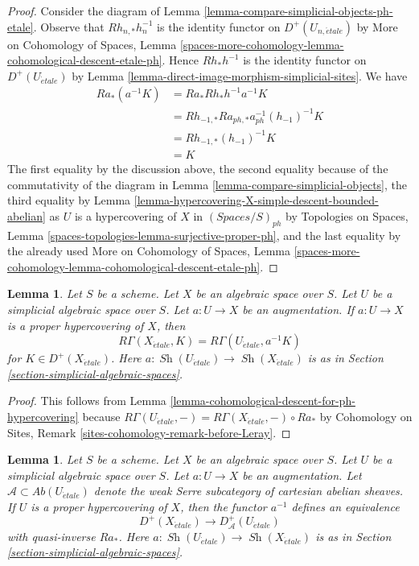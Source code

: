 \documentclass{stacks-project}
\theoremstyle{plain}
\newtheorem{lemma}[subsection]{Lemma}
\theoremstyle{definition}
\theoremstyle{remark}
\numberwithin{equation}{subsection}
\def\Sh{\mathop{\mathit{Sh}}\nolimits}
\def\etale{{\acute{e}tale}}
\begin{document}
\begin{proof}
Consider the diagram of Lemma \ref{lemma-compare-simplicial-objects-ph-etale}.
Observe that $Rh_{n, *}h_n^{-1}$ is the identity functor
on $D^+(U_{n, \etale})$ by
More on Cohomology of Spaces, Lemma
\ref{spaces-more-cohomology-lemma-cohomological-descent-etale-ph}.
Hence $Rh_*h^{-1}$ is the identity functor on
$D^+(U_\etale)$ by
Lemma \ref{lemma-direct-image-morphism-simplicial-sites}.
We have
\begin{align*}
Ra_*(a^{-1}K)
& =
Ra_*Rh_*h^{-1}a^{-1}K \\
& =
Rh_{-1, *}Ra_{ph, *}a_{ph}^{-1}(h_{-1})^{-1}K \\
& =
Rh_{-1, *}(h_{-1})^{-1}K \\
& =
K
\end{align*}
The first equality by the discussion above, the second equality
because of the commutativity of the diagram in
Lemma \ref{lemma-compare-simplicial-objects}, the third equality by
Lemma \ref{lemma-hypercovering-X-simple-descent-bounded-abelian}
as $U$ is a hypercovering of $X$ in $(\textit{Spaces}/S)_{ph}$
by Topologies on Spaces, Lemma
\ref{spaces-topologies-lemma-surjective-proper-ph},
and the last equality by the already used
More on Cohomology of Spaces, Lemma
\ref{spaces-more-cohomology-lemma-cohomological-descent-etale-ph}.
\end{proof}

\begin{lemma}
\label{lemma-compute-via-ph-hypercovering}
Let $S$ be a scheme. Let $X$ be an algebraic space over $S$.
Let $U$ be a simplicial algebraic space over $S$. Let $a : U \to X$
be an augmentation. If $a : U \to X$ is a proper hypercovering of $X$, then
$$
R\Gamma(X_\etale, K) = R\Gamma(U_\etale, a^{-1}K)
$$
for $K \in D^+(X_\etale)$. Here $a : \Sh(U_\etale) \to \Sh(X_\etale)$
is as in Section \ref{section-simplicial-algebraic-spaces}.
\end{lemma}

\begin{proof}
This follows from
Lemma \ref{lemma-cohomological-descent-for-ph-hypercovering}
because $R\Gamma(U_\etale, -) = R\Gamma(X_\etale, -) \circ Ra_*$ by
Cohomology on Sites, Remark \ref{sites-cohomology-remark-before-Leray}.
\end{proof}

\begin{lemma}
\label{lemma-ph-hypercovering-equivalence-bounded}
Let $S$ be a scheme. Let $X$ be an algebraic space over $S$.
Let $U$ be a simplicial algebraic space over $S$. Let $a : U \to X$
be an augmentation.
Let $\mathcal{A} \subset \textit{Ab}(U_\etale)$
denote the weak Serre subcategory of cartesian abelian sheaves.
If $U$ is a proper hypercovering of $X$, then
the functor $a^{-1}$ defines an equivalence
$$
D^+(X_\etale) \longrightarrow D_\mathcal{A}^+(U_\etale)
$$
with quasi-inverse $Ra_*$. Here $a : \Sh(U_\etale) \to \Sh(X_\etale)$
is as in Section \ref{section-simplicial-algebraic-spaces}.
\end{lemma}
\end{document}
